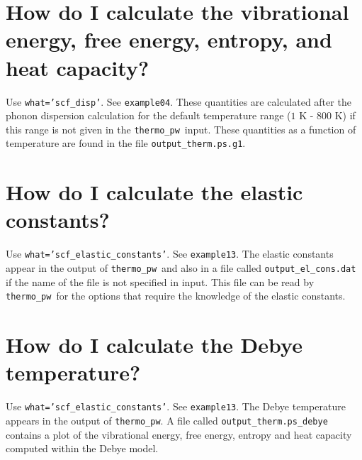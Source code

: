 \documentclass[12pt,a4paper]{article}
\def\thermo{\texttt{thermo\_pw}}
\begin{document}
\section{\color{coral}How do I calculate the vibrational energy, free energy, entropy, and heat capacity?}
Use \texttt{what='scf\_disp'}. See \texttt{example04}. These quantities
are calculated after the phonon dispersion calculation for the default 
temperature range ($1$ K - $800$ K) if this range
is not given in the \thermo\ input. These quantities 
as a function of temperature are found in the file \texttt{output\_therm.ps.g1}.

\section{\color{coral}How do I calculate the elastic constants?}
Use \texttt{what='scf\_elastic\_constants'}. See \texttt{example13}. The
elastic constants appear in the output of \thermo\ and also in a file
called \texttt{output\_el\_cons.dat} if the name of the file is not
specified in input. This file can be read by \thermo\ for the options
that require the knowledge of the elastic constants.

\section{\color{coral}How do I calculate the Debye temperature?}
Use \texttt{what='scf\_elastic\_constants'}. See \texttt{example13}. The
Debye temperature appears in the output of \thermo. A file called
\texttt{output\_therm.ps\_debye} contains a plot of the vibrational
energy, free energy, entropy and heat capacity computed within the 
Debye model.
\end{document}
